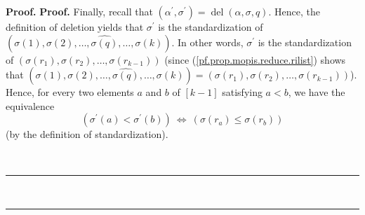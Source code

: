 \documentclass[numbers=enddot,12pt,final,onecolumn,notitlepage]{scrartcl}%
\theoremstyle{definition}
\newenvironment{fineprint}{\begin{small}}{\end{small}}
\newenvironment{proof}[1][Proof]{\noindent\textbf{#1.} }{\ \rule{0.5em}{0.5em}}
\begin{document}
\begin{fineprint}
\begin{proof}
\begin{proof}
Finally, recall that $\left(  \alpha^{\prime},\sigma^{\prime}\right)
=\operatorname*{del}\left(  \alpha,\sigma,q\right)  $. Hence, the definition
of deletion yields that $\sigma^{\prime}$ is the standardization of $\left(
\sigma\left(  1\right)  ,\sigma\left(  2\right)  ,\ldots,\widehat{\sigma
\left(  q\right)  },\ldots,\sigma\left(  k\right)  \right)  $. In other words,
$\sigma^{\prime}$ is the standardization of $\left(  \sigma\left(
r_{1}\right)  ,\sigma\left(  r_{2}\right)  ,\ldots,\sigma\left(
r_{k-1}\right)  \right)  $ (since (\ref{pf.prop.mopis.reduce.rilist}) shows
that $\left(  \sigma\left(  1\right)  ,\sigma\left(  2\right)  ,\ldots
,\widehat{\sigma\left(  q\right)  },\ldots,\sigma\left(  k\right)  \right)
=\left(  \sigma\left(  r_{1}\right)  ,\sigma\left(  r_{2}\right)
,\ldots,\sigma\left(  r_{k-1}\right)  \right)  $). Hence, for every two
elements $a$ and $b$ of $\left[  k-1\right]  $ satisfying $a<b$, we have the
equivalence%
\begin{equation}
\left(  \sigma^{\prime}\left(  a\right)  <\sigma^{\prime}\left(  b\right)
\right)  \ \Longleftrightarrow\ \left(  \sigma\left(  r_{a}\right)  \leq
\sigma\left(  r_{b}\right)  \right)  \label{pf.prop.mopis.reduce.equiv3}%
\end{equation}
(by the definition of standardization).


\end{proof}
\end{proof}
\end{fineprint}
\end{document}
